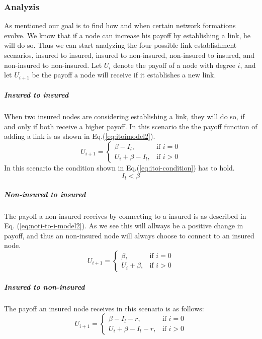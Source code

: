 \subsubsection{Analyzis}
As mentioned our goal is to find how and when certain network formations evolve. We know that if a node can increase his payoff by establishing a link, he will do so. Thus we can start analyzing the four possible link establishment scenarios, insured to insured, insured to non-insured, non-insured to insured, and non-insured to non-insured. 
Let $U_{i}$ denote the payoff of a node with degree $i$, and let $U_{i+1}$ be the payoff a node will receive if it establishes a new link.
\subparagraph{Insured to insured}
When two insured nodes are considering establishing a link, they will do so, if and only if both receive a higher payoff.  In this scenario the the payoff function of adding a link is as shown in Eq.(\ref{eq:itoimodel2}).
\begin{equation}
    U_{i+1}= 
\begin{cases}
    \beta - I_{l},& \text{if } i = 0\\
    U_{i}+\beta -I_{l},& \text{if }  i>0
   
\end{cases}
\label{eq:itoimodel2}
\end{equation}
In this scenario the condition shown in Eq.(\ref{eq:itoi-condition}) has to hold.
\begin{equation}
I_{l}<\beta
\label{eq:itoi-condition}
\end{equation}
\subparagraph{Non-insured to insured}
The payoff a non-insured receives by connecting to a insured is as described in Eq. (\ref{eq:noti-to-i-model2}). As we see this will allways be a positive change in payoff, and thus an non-insured node will always choose to connect to an insured node.
\begin{equation}
    U_{i+1}= 
\begin{cases}
    \beta,& \text{if } i = 0\\
    U_{i}+\beta,& \text{if }  i>0
   
\end{cases}
\label{eq:noti-to-i-model2}
\end{equation}
\subparagraph{Insured to non-insured}
The payoff an insured node receives in this scenario is as follows:
\begin{equation}
    U_{i+1}= 
\begin{cases}
    \beta - I_{l}-r,& \text{if } i = 0\\
    U_{i}+\beta -I_{l}-r,& \text{if }  i>0
   
\end{cases}
\label{eq:itonotimodel2}
\end{equation}
